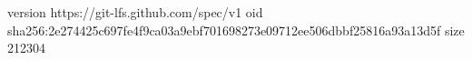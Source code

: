 version https://git-lfs.github.com/spec/v1
oid sha256:2e274425c697fe4f9ca03a9ebf701698273e09712ee506dbbf25816a93a13d5f
size 212304
